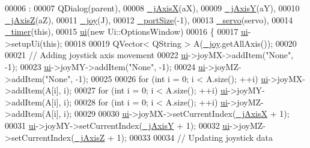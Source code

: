 \begin{DoxyCode}
00006                                                                 :
00007     QDialog(parent),
00008     \hyperlink{a00006_a01d6284355011203ee6e8856a0bdf557}{\_jAxisX}(aX),
00009     \hyperlink{a00006_a8921d1cc5bcb527466c28feb5dcc59b1}{\_jAxisY}(aY),
00010     \hyperlink{a00006_a47409f50a87942706baaea3d025785e3}{\_jAxisZ}(aZ),
00011     \hyperlink{a00006_a1bf846ab681ab245f70adac30999947c}{\_joy}(J),
00012     \hyperlink{a00006_a9bd4dccc7a544b1db78dc8cf330b88f6}{\_portSize}(-1),
00013     \hyperlink{a00006_acba1566fea3f831000d5e1c1edc3e776}{\_servo}(servo),
00014     \hyperlink{a00006_af6320942b8558140989f552b3bbc1fbd}{\_timer}(\textcolor{keyword}{this}),
00015     \hyperlink{a00006_a8347442d5b3b670e8fff0c4102db1f88}{ui}(\textcolor{keyword}{new} Ui::OptionsWindow)
00016 \{
00017     \hyperlink{a00006_a8347442d5b3b670e8fff0c4102db1f88}{ui}->setupUi(\textcolor{keyword}{this});
00018     
00019     QVector< QString > A(\hyperlink{a00006_a1bf846ab681ab245f70adac30999947c}{\_joy}.getAllAxis());
00020     
00021     \textcolor{comment}{// Adding joystick axis movement}
00022     \hyperlink{a00006_a8347442d5b3b670e8fff0c4102db1f88}{ui}->joyMX->addItem(\textcolor{stringliteral}{"None"}, -1);
00023     \hyperlink{a00006_a8347442d5b3b670e8fff0c4102db1f88}{ui}->joyMY->addItem(\textcolor{stringliteral}{"None"}, -1);
00024     \hyperlink{a00006_a8347442d5b3b670e8fff0c4102db1f88}{ui}->joyMZ->addItem(\textcolor{stringliteral}{"None"}, -1);
00025     
00026     \textcolor{keywordflow}{for} (\textcolor{keywordtype}{int} i = 0; i < A.size(); ++i) \hyperlink{a00006_a8347442d5b3b670e8fff0c4102db1f88}{ui}->joyMX->addItem(A[i], i);
00027     \textcolor{keywordflow}{for} (\textcolor{keywordtype}{int} i = 0; i < A.size(); ++i) \hyperlink{a00006_a8347442d5b3b670e8fff0c4102db1f88}{ui}->joyMY->addItem(A[i], i);
00028     \textcolor{keywordflow}{for} (\textcolor{keywordtype}{int} i = 0; i < A.size(); ++i) \hyperlink{a00006_a8347442d5b3b670e8fff0c4102db1f88}{ui}->joyMZ->addItem(A[i], i);
00029     
00030     \hyperlink{a00006_a8347442d5b3b670e8fff0c4102db1f88}{ui}->joyMX->setCurrentIndex(\hyperlink{a00006_a01d6284355011203ee6e8856a0bdf557}{\_jAxisX} + 1);
00031     \hyperlink{a00006_a8347442d5b3b670e8fff0c4102db1f88}{ui}->joyMY->setCurrentIndex(\hyperlink{a00006_a8921d1cc5bcb527466c28feb5dcc59b1}{\_jAxisY} + 1);
00032     \hyperlink{a00006_a8347442d5b3b670e8fff0c4102db1f88}{ui}->joyMZ->setCurrentIndex(\hyperlink{a00006_a47409f50a87942706baaea3d025785e3}{\_jAxisZ} + 1);
00033     
00034     \textcolor{comment}{// Updating joystick data}

\end{DoxyCode}
